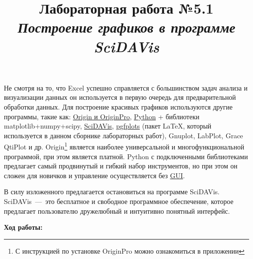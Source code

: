 \documentclass[14pt,a4paper]{article}
\title{Лабораторная работа №5.1 \\ \textit{Построение графиков в программе SciDAVis}}
\begin{document}
\maketitle
Не смотря на то, что Excel успешно справляется с большинством задач анализа и визуализации данных он используется в первую очередь для предварительной обработки данных. Для построение красивых графиков используются другие программы, такие как: \href{https://www.originlab.com/index.aspx?go=Products/Origin}{Origin и OriginPro}, \href{https://www.python.org/}{Python} + библиотеки matplotlib+numpy+scipy, \href{https://scidavis.sourceforge.net/}{SciDAVis}, \href{https://www.ctan.org/pkg/pgfplots}{pgfplots} (пакет \LaTeX, который используется в данном сборнике лабораторных работ), Gnuplot, LabPlot, Grace QtiPlot и др. Origin\footnote{С инструкцией по установке OriginPro можно ознакомиться в приложении} является наиболее универсальной и многофункциональной программой, при этом является платной. Python с подключенными библиотеками предлагает самый продвинутый и гибкий набор инструментов, но при этом он сложен для новичков и управление осуществляется без \href{https://ru.wikipedia.org/wiki/%D0%93%D1%80%D0%B0%D1%84%D0%B8%D1%87%D0%B5%D1%81%D0%BA%D0%B8%D0%B9_%D0%B8%D0%BD%D1%82%D0%B5%D1%80%D1%84%D0%B5%D0%B9%D1%81_%D0%BF%D0%BE%D0%BB%D1%8C%D0%B7%D0%BE%D0%B2%D0%B0%D1%82%D0%B5%D0%BB%D1%8F}{GUI}.

В силу изложенного предлагается остановиться на программе SciDAVis. SciDAVis~---~это бесплатное и свободное программное обеспечение, которое предлагает пользователю дружелюбный и интуитивно понятный интерфейс. 

\begin{center}
    \textbf{Ход работы:}
\end{center}
\end{document}
